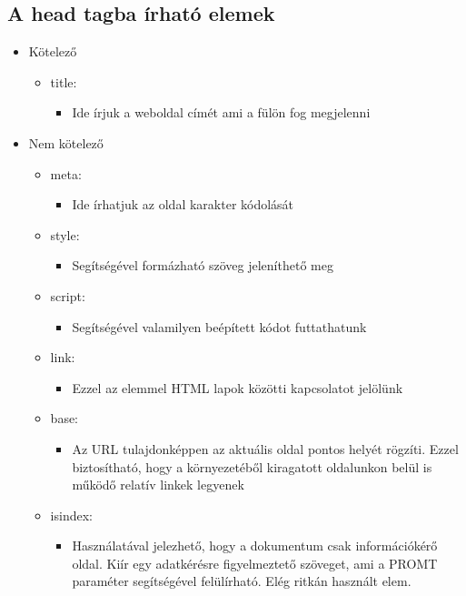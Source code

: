 \documentclass{thesis-ekf}
\theoremstyle{definition}
\begin{document}
\subsection{A head tagba írható elemek}
\begin{itemize}
	\item Kötelező
	\begin{itemize}
		\item title:
		\begin{itemize}
			\item Ide írjuk a weboldal  címét ami a fülön fog megjelenni
		\end{itemize}
	\end{itemize}
	\item Nem kötelező
	\begin{itemize}
		\item meta:
		\begin{itemize}
			\item Ide írhatjuk az oldal karakter kódolását
		\end{itemize}
	\item style:
	\begin{itemize}
		\item Segítségével formázható szöveg jeleníthető meg
	\end{itemize}
	\item script:
	\begin{itemize}
		\item Segítségével valamilyen beépített kódot futtathatunk
	\end{itemize}
	\item link:
	\begin{itemize}
		\item Ezzel az elemmel HTML lapok közötti kapcsolatot jelölünk
	\end{itemize}
	\item base:
	\begin{itemize}
		\item Az URL tulajdonképpen az aktuális oldal pontos helyét rögzíti. Ezzel biztosítható, hogy a környezetéből kiragatott oldalunkon belül is működő relatív linkek legyenek
	\end{itemize}
	\item isindex:
	\begin{itemize}
		\item Használatával jelezhető, hogy a dokumentum csak információkérő oldal. Kiír egy adatkérésre figyelmeztető szöveget, ami a PROMT paraméter segítségével felülírható. Elég ritkán használt elem.
	\end{itemize}
	\end{itemize}
\end{itemize}
\end{document}
